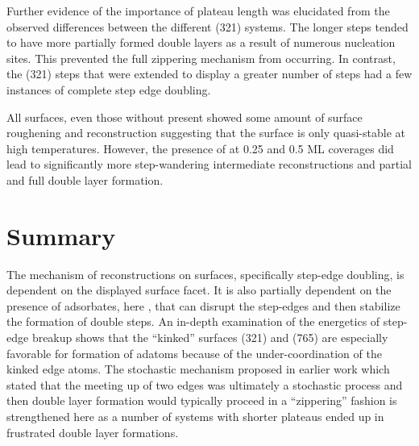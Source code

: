 Further evidence of the importance of plateau length was elucidated from the
observed differences between the different (321) systems. The
longer steps tended to have more partially formed double layers as
a result of numerous nucleation sites. This prevented the full
zippering mechanism from occurring. In contrast, the (321) steps that were
extended to display a greater number of steps had a few
instances of complete step edge doubling.

All surfaces, even those without  present showed some amount of surface
roughening and reconstruction suggesting that the surface is only quasi-stable
at high temperatures. However, the presence of  at 0.25 and 0.5 ML
coverages did lead to significantly more step-wandering intermediate
reconstructions and partial and full double layer formation.




\section{Summary}
The mechanism of reconstructions on  surfaces, specifically step-edge
doubling, is dependent on the displayed surface facet. It is also
partially dependent on the presence of adsorbates, here , that can 
disrupt the step-edges and then stabilize the formation of double steps. An in-depth
examination of the energetics of step-edge breakup shows that the ``kinked''
surfaces (321) and (765) are especially favorable for formation of adatoms
because of the under-coordination of the kinked edge atoms. The stochastic
mechanism proposed in earlier work which stated that the meeting up of two
edges was ultimately a stochastic process and then double layer formation would
typically proceed in a ``zippering'' fashion is strengthened here as a number of
systems with shorter plateaus ended up in frustrated double layer formations.

